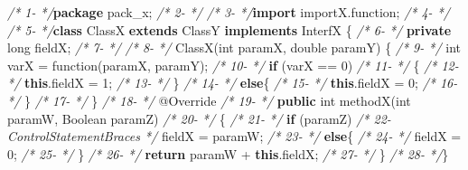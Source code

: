 \documentclass[
]{article}
\newenvironment{Shaded}{\begin{snugshade}}{\end{snugshade}}
\newcommand{\AttributeTok}[1]{\textcolor[rgb]{0.77,0.63,0.00}{#1}}
\newcommand{\BuiltInTok}[1]{#1}
\newcommand{\CommentTok}[1]{\textcolor[rgb]{0.56,0.35,0.01}{\textit{#1}}}
\newcommand{\DataTypeTok}[1]{\textcolor[rgb]{0.13,0.29,0.53}{#1}}
\newcommand{\DecValTok}[1]{\textcolor[rgb]{0.00,0.00,0.81}{#1}}
\newcommand{\FunctionTok}[1]{\textcolor[rgb]{0.00,0.00,0.00}{#1}}
\newcommand{\ImportTok}[1]{#1}
\newcommand{\KeywordTok}[1]{\textcolor[rgb]{0.13,0.29,0.53}{\textbf{#1}}}
\newcommand{\NormalTok}[1]{#1}
\begin{document}
\begin{Shaded}
\begin{Highlighting}[]
\CommentTok{/*  1-                                   */}\KeywordTok{package}\ImportTok{ pack_x;}
\CommentTok{/*  2-                                   */}  
\CommentTok{/*  3-                                   */}\KeywordTok{import}\ImportTok{ importX.function;}
\CommentTok{/*  4-                                   */}
\CommentTok{/*  5-                                   */}\KeywordTok{class}\NormalTok{ ClassX }\KeywordTok{extends}\NormalTok{ ClassY }\KeywordTok{implements}\NormalTok{ InterfX \{}
\CommentTok{/*  6-                                   */}    \KeywordTok{private} \DataTypeTok{long}\NormalTok{ fieldX;}
\CommentTok{/*  7-                                   */}    
\CommentTok{/*  8-                                   */}    \FunctionTok{ClassX}\NormalTok{(}\DataTypeTok{int}\NormalTok{ paramX, }\DataTypeTok{double}\NormalTok{ paramY) \{      }
\CommentTok{/*  9-                                   */}        \DataTypeTok{int}\NormalTok{ varX = }\FunctionTok{function}\NormalTok{(paramX, paramY);     }
\CommentTok{/* 10-                                   */}        \KeywordTok{if}\NormalTok{ (varX == }\DecValTok{0}\NormalTok{)}
\CommentTok{/* 11-                                   */}\NormalTok{        \{}
\CommentTok{/* 12-                                   */}            \KeywordTok{this}\NormalTok{.}\FunctionTok{fieldX}\NormalTok{ = }\DecValTok{1}\NormalTok{;}
\CommentTok{/* 13-                                   */}\NormalTok{        \}            }
\CommentTok{/* 14-                                   */}        \KeywordTok{else}\NormalTok{\{}
\CommentTok{/* 15-                                   */}            \KeywordTok{this}\NormalTok{.}\FunctionTok{fieldX}\NormalTok{ = }\DecValTok{0}\NormalTok{;}
\CommentTok{/* 16-                                   */}\NormalTok{     \}}
\CommentTok{/* 17-                                   */}\NormalTok{    \}}
\CommentTok{/* 18-                                   */}    \AttributeTok{@Override}
\CommentTok{/* 19-                                   */}    \KeywordTok{public} \DataTypeTok{int} \FunctionTok{methodX}\NormalTok{(}\DataTypeTok{int}\NormalTok{ paramW, }\BuiltInTok{Boolean}\NormalTok{ paramZ)}
\CommentTok{/* 20-                                   */}\NormalTok{    \{}
\CommentTok{/* 21-                                   */}        \KeywordTok{if}\NormalTok{ (paramZ)}
\CommentTok{/* 22-ControlStatementBraces             */}\NormalTok{            fieldX = paramW;}
\CommentTok{/* 23-                                   */}        \KeywordTok{else}\NormalTok{\{}
\CommentTok{/* 24-                                   */}\NormalTok{            fieldX = }\DecValTok{0}\NormalTok{;}
\CommentTok{/* 25-                                   */}\NormalTok{     \}}
\CommentTok{/* 26-                                   */}        \KeywordTok{return}\NormalTok{ paramW + }\KeywordTok{this}\NormalTok{.}\FunctionTok{fieldX}\NormalTok{;}
\CommentTok{/* 27-                                   */}\NormalTok{     \}}
\CommentTok{/* 28-                                   */}\NormalTok{\}  }
\end{Highlighting}
\end{Shaded}
\end{document}
